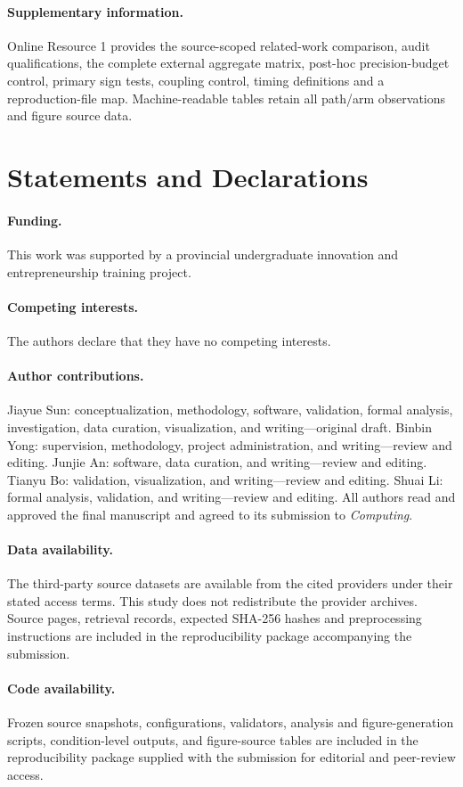 \documentclass[smallextended]{svjour3}
\begin{document}
\paragraph{Supplementary information.} Online Resource 1 provides the source-scoped related-work comparison, audit qualifications, the complete external aggregate matrix, post-hoc precision-budget control, primary sign tests, coupling control, timing definitions and a reproduction-file map. Machine-readable tables retain all path/arm observations and figure source data.
\section*{Statements and Declarations}
\paragraph{Funding.} This work was supported by a provincial undergraduate innovation and entrepreneurship training project.
\paragraph{Competing interests.} The authors declare that they have no competing interests.
\paragraph{Author contributions.} Jiayue Sun: conceptualization, methodology, software, validation, formal analysis, investigation, data curation, visualization, and writing---original draft. Binbin Yong: supervision, methodology, project administration, and writing---review and editing. Junjie An: software, data curation, and writing---review and editing. Tianyu Bo: validation, visualization, and writing---review and editing. Shuai Li: formal analysis, validation, and writing---review and editing. All authors read and approved the final manuscript and agreed to its submission to \textit{Computing}.
\paragraph{Data availability.} The third-party source datasets are available from the cited providers under their stated access terms. This study does not redistribute the provider archives. Source pages, retrieval records, expected SHA-256 hashes and preprocessing instructions are included in the reproducibility package accompanying the submission.
\paragraph{Code availability.} Frozen source snapshots, configurations, validators, analysis and figure-generation scripts, condition-level outputs, and figure-source tables are included in the reproducibility package supplied with the submission for editorial and peer-review access.
\end{document}
